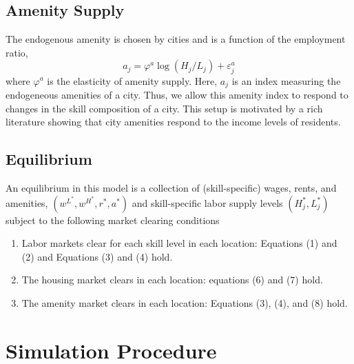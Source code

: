 \documentclass{article}
\begin{document}
\subsection{Amenity Supply}
The endogenous amenity is chosen by cities and is a function of the employment ratio,
\begin{equation}\label{eq: amenity supply} 
a_{j} = \varphi^a \log(H_{j}/L_{j}) + \varepsilon^a_{j} \end{equation}
where $\varphi^a$ is the elasticity of amenity supply. Here, $a_{j}$ is an index measuring the endogeneous amenities of a city. Thus, we allow this amenity index to respond to changes in the skill composition of a city. This setup is motivated by a rich literature showing that city amenities respond to the income levels of residents. 



\subsection{Equilibrium}
An equilibrium in this model is a collection of (skill-specific) wages, rents, and amenities, $(w^{L^*},w^{H^*},r^*,a^*)$ and skill-specific labor supply levels $(H_{j}^*,L_{j}^*)$ subject to the following market clearing conditions 
\begin{enumerate}
\item Labor markets clear for each skill level in each location: Equations (1) and (2) and Equations (3) and (4) hold. 
\item The housing market clears in each location: equations (6) and (7) hold.

\item The amenity market clears in each location: 
Equations (3), (4), and (8) hold. 
\end{enumerate}

\section{Simulation Procedure}
\end{document}
